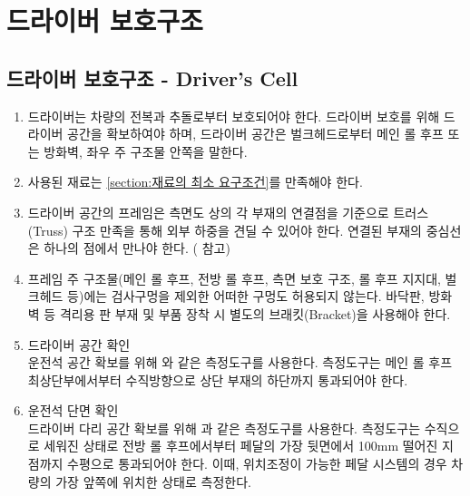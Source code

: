 \documentclass[final,a4paper,10pt]{report}
\begin{document}
\chapter{드라이버 보호구조}

\section{드라이버 보호구조 - Driver’s Cell}\label{rule:formula-technical.driver-cell} \label{section:드라이버 보호구조}
\begin{enumerate}
  \item\label{rule:formula-technical.driver-cell.driver-space-definition} 드라이버는 차량의 전복과 추돌로부터 보호되어야 한다. 드라이버 보호를 위해 드라이버 공간을 확보하여야 하며, 드라이버 공간은 벌크헤드로부터 메인 롤 후프 또는 방화벽, 좌우 주 구조물 안쪽을 말한다.
  \item\label{rule:formula-technical.driver-cell.material-compliance} 사용된 재료는 \ref{section:재료의 최소 요구조건}를 만족해야 한다.


  \item\label{rule:formula-technical.driver-cell.truss-node-alignment} 드라이버 공간의 프레임은 측면도 상의 각 부재의 연결점을 기준으로 트러스(Truss) 구조 만족을 통해 외부 하중을 견딜 수 있어야 한다. 연결된 부재의 중심선은 하나의 점에서 만나야 한다. ( 참고)


  \item\label{rule:formula-technical.driver-cell.no-holes-use-brackets} 프레임 주 구조물(메인 롤 후프, 전방 롤 후프, 측면 보호 구조, 롤 후프 지지대, 벌크헤드 등)에는 검사구멍을 제외한 어떠한 구멍도 허용되지 않는다. 바닥판, 방화벽 등 격리용 판 부재 및 부품 장착 시 별도의 브래킷(Bracket)을 사용해야 한다.
  \item\label{rule:formula-technical.driver-cell.cockpit-template-check} 드라이버 공간 확인 \\
    운전석 공간 확보를 위해 와 같은 측정도구를 사용한다. 측정도구는 메인 롤 후프 최상단부에서부터 수직방향으로 상단 부재의 하단까지 통과되어야 한다.


  \item\label{rule:formula-technical.driver-cell.internal-cross-section-check} 운전석 단면 확인 \\
    드라이버 다리 공간 확보를 위해 과 같은 측정도구를 사용한다. 측정도구는 수직으로 세워진 상태로 전방 롤 후프에서부터 페달의 가장 뒷면에서 100mm 떨어진 지점까지 수평으로 통과되어야 한다. 이때, 위치조정이 가능한 페달 시스템의 경우 차량의 가장 앞쪽에 위치한 상태로 측정한다.

\end{enumerate}
\end{document}
